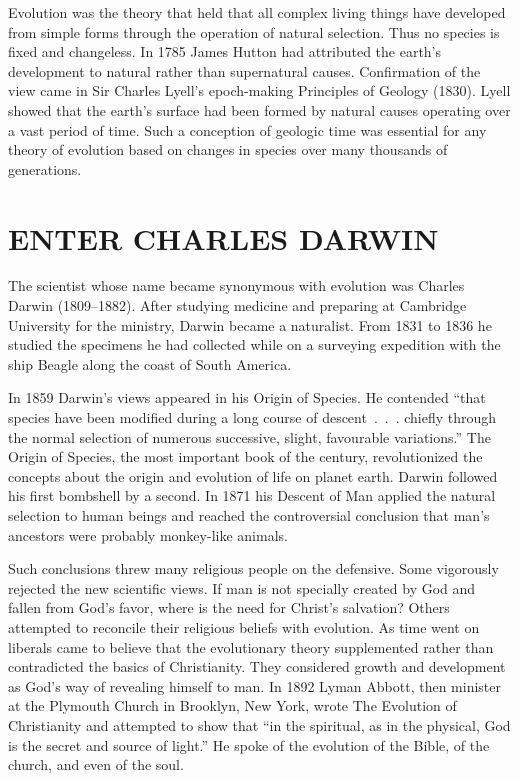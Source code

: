 Evolution was the theory that held that all complex living things have developed from simple forms
through the operation of natural selection. Thus no species is fixed and changeless. In 1785 James
Hutton had attributed the earth’s development to natural rather than supernatural causes.
Confirmation of the view came in Sir Charles Lyell’s epoch-making Principles of Geology (1830).
Lyell showed that the earth’s surface had been formed by natural causes operating over a vast period
of time. Such a conception of geologic time was essential for any theory of evolution based on
changes in species over many thousands of generations.

\section{ENTER CHARLES DARWIN}

The scientist whose name became synonymous with evolution was Charles Darwin (1809–1882). After
studying medicine and preparing at Cambridge University for the ministry, Darwin became a
naturalist. From 1831 to 1836 he studied the specimens he had collected while on a surveying
expedition with the ship Beagle along the coast of South America.

In 1859 Darwin’s views appeared in his Origin of Species. He contended “that species have been
modified during a long course of descent~.~.~. chiefly through the normal selection of numerous
successive, slight, favourable variations.” The Origin of Species, the most important book of the
century, revolutionized the concepts about the origin and evolution of life on planet earth. Darwin
followed his first bombshell by a second. In 1871 his Descent of Man applied the natural selection
to human beings and reached the controversial conclusion that man’s ancestors were probably
monkey-like animals.

Such conclusions threw many religious people on the defensive. Some vigorously rejected the new
scientific views. If man is not specially created by God and fallen from God’s favor, where is the
need for Christ’s salvation? Others attempted to reconcile their religious beliefs with evolution.
As time went on liberals came to believe that the evolutionary theory supplemented rather than
contradicted the basics of Christianity. They considered growth and development as God’s way of
revealing himself to man. In 1892 Lyman Abbott, then minister at the Plymouth Church in Brooklyn,
New York, wrote The Evolution of Christianity and attempted to show that “in the spiritual, as in
the physical, God is the secret and source of light.” He spoke of the evolution of the Bible, of the
church, and even of the soul.

